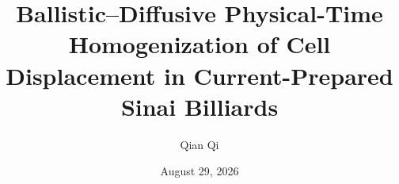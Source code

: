 \documentclass[11pt,reqno]{amsart}
\title[Physical-time homogenization of Sinai cell displacement]{Ballistic--Diffusive Physical-Time Homogenization of Cell Displacement in Current-Prepared Sinai Billiards}
\author{Qian Qi}
\date{August 29, 2026}
\theoremstyle{definition}
\theoremstyle{remark}
\begin{document}
\raggedbottom



\end{document}
